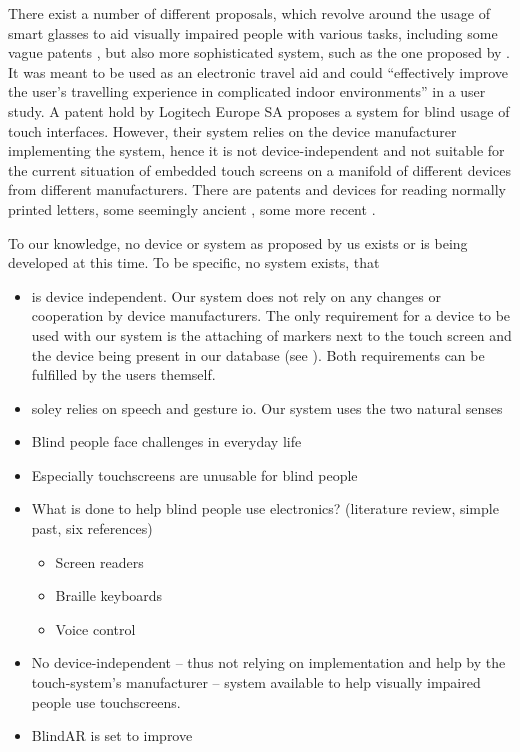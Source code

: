 There exist a number of different proposals, which revolve around the usage of smart glasses to aid visually impaired people with various tasks, including some vague patents \autocite{smartglasses, smartglasses2}, but also more sophisticated system, such as the one proposed by \textcite{bai2017smart}.
It was meant to be used as an electronic travel aid and could \enquote{effectively improve the user's travelling experience in complicated indoor environments} in a user study.
A patent hold by Logitech Europe SA \autocite{logitech} proposes a system for blind usage of touch interfaces.
However, their system relies on the device manufacturer implementing the system, hence it is not device-independent and not suitable for the current situation of embedded touch screens on a manifold of different devices from different manufacturers.
There are patents and devices for reading normally printed letters, some seemingly ancient \cite{ring}, some more recent \cite{ring2}.

To our knowledge, no device or system as proposed by us exists or is being developed at this time.
To be specific, no system exists, that 
\begin{itemize}
	\item
		is device independent.
		Our system does not rely on any changes or cooperation by device manufacturers.
		The only requirement for a device to be used with our system is the attaching of markers next to the touch screen and the device being present in our database (see ).
		Both requirements can be fulfilled by the users themself.
	\item
		soley relies on speech and gesture \ac{io}.
		Our system uses the two natural senses 
\end{itemize}


\begin{itemize}
	\item
		Blind people face challenges in everyday life
	\item
		Especially touchscreens are unusable for blind people
	\item
		What is done to help blind people use electronics? (literature review, simple past, six references)
		\begin{itemize}
			\item
				Screen readers
			\item
				Braille keyboards
			\item
				Voice control
		\end{itemize}
	\item
		No device-independent --  thus not relying on implementation and help by the touch-system's manufacturer -- system available to help visually impaired people use touchscreens.
	\item
		BlindAR is set to improve 
\end{itemize}

